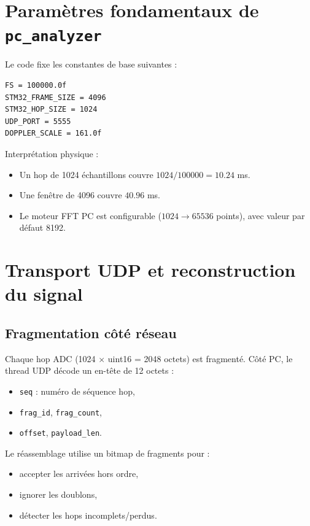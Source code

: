 \documentclass[a4paper,11pt]{article}
\begin{document}
\section{Param\`etres fondamentaux de \texttt{pc\_analyzer}}

Le code fixe les constantes de base suivantes :
\begin{lstlisting}[style=cstyle]
FS = 100000.0f
STM32_FRAME_SIZE = 4096
STM32_HOP_SIZE = 1024
UDP_PORT = 5555
DOPPLER_SCALE = 161.0f
\end{lstlisting}

Interpr\'etation physique :
\begin{itemize}[leftmargin=2em]
  \item Un hop de 1024 \'echantillons couvre \(1024/100000 = 10.24\) ms.
  \item Une fen\^etre de 4096 couvre \(40.96\) ms.
  \item Le moteur FFT PC est configurable (\(1024 \rightarrow 65536\) points), avec valeur par d\'efaut 8192.
\end{itemize}

\section{Transport UDP et reconstruction du signal}

\subsection{Fragmentation c\^ot\'e r\'eseau}

Chaque hop ADC (1024 \(\times\) uint16 = 2048 octets) est fragment\'e. C\^ot\'e PC, le thread UDP d\'ecode un en-t\^ete de 12 octets :
\begin{itemize}[leftmargin=2em]
  \item \texttt{seq} : num\'ero de s\'equence hop,
  \item \texttt{frag\_id}, \texttt{frag\_count},
  \item \texttt{offset}, \texttt{payload\_len}.
\end{itemize}

Le r\'eassemblage utilise un bitmap de fragments pour :
\begin{itemize}[leftmargin=2em]
  \item accepter les arriv\'ees hors ordre,
  \item ignorer les doublons,
  \item d\'etecter les hops incomplets/perdus.
\end{itemize}
\end{document}
